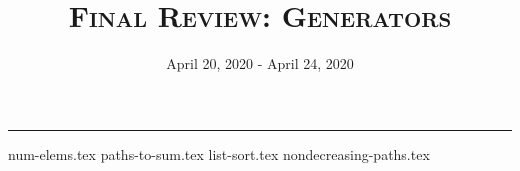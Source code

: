 \documentclass{exam}
\title{\textsc{Final Review: Generators}}
\date{April 20, 2020 - April 24, 2020}
\begin{document}
\maketitle\rule{\textwidth}{0.15em}
\fontsize{12}{15}\selectfont

\begin{questions}
{num-elems.tex}
\newpage
{paths-to-sum.tex}
\newpage
{list-sort.tex}
\newpage
{nondecreasing-paths.tex}
\end{questions}
\end{document}
